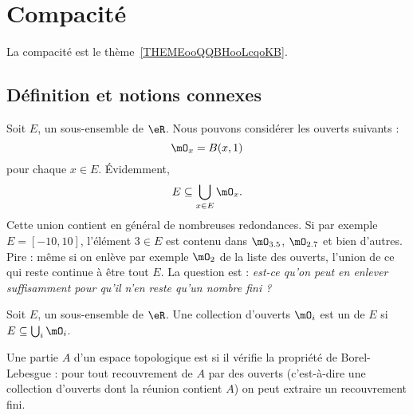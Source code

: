 \section{Compacité}

La compacité est le thème~\ref{THEMEooQQBHooLcqoKB}.

\subsection{Définition et notions connexes}

Soit $E$, un sous-ensemble de $\eR$. Nous pouvons considérer les ouverts suivants :
\begin{equation}
    \mO_x=B(x,1)
\end{equation}
pour chaque $x\in E$. Évidemment,
\begin{equation}
    E\subseteq \bigcup_{x\in E}\mO_x.
\end{equation}
Cette union contient en général de nombreuses redondances. Si par exemple $E=[-10,10]$, l'élément $3\in E$ est contenu dans $\mO_{3.5}$, $\mO_{2.7}$ et bien d'autres. Pire : même si on enlève par exemple $\mO_2$ de la liste des ouverts, l'union de ce qui reste continue à être tout $E$. La question est : \emph{est-ce qu'on peut en enlever suffisamment pour qu'il n'en reste qu'un nombre fini ?}

\begin{definition} 
Soit $E$, un sous-ensemble de $\eR$. Une collection d'ouverts $\mO_i$ est un  de $E$ si $E\subseteq \bigcup_{i}\mO_i$.
\end{definition}

\begin{definition} \label{DefJJVsEqs}
    Une partie $A$ d'un espace topologique est  si il vérifie la propriété de Borel-Lebesgue : pour tout recouvrement de $A$ par des ouverts (c'est-à-dire une collection d'ouverts dont la réunion contient $A$) on peut extraire un recouvrement fini.
\end{definition}

